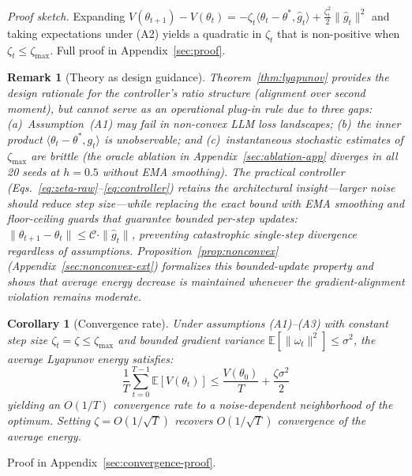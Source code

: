 \documentclass{article}
\newtheorem{corollary}{Corollary}
\newtheorem{remark}{Remark}
\begin{document}
\textit{Proof sketch.} Expanding
$V(\theta_{t+1}) - V(\theta_t) = -\zeta_t \langle \theta_t - \theta^*,
\hat{g}_t \rangle + \tfrac{\zeta_t^2}{2}\|\hat{g}_t\|^2$ and taking
expectations under (A2) yields a quadratic in $\zeta_t$ that is
non-positive when $\zeta_t \leq \zeta_{\max}$.
Full proof in Appendix~\ref{sec:proof}.

\begin{remark}[Theory as design guidance]
\label{rem:theory-practice}
Theorem~\ref{thm:lyapunov} provides the \emph{design rationale} for the controller's ratio structure (alignment over second moment), but cannot serve as an operational plug-in rule due to three gaps: (a)~Assumption~(A1) may fail in non-convex LLM loss landscapes; (b)~the inner product $\langle \theta_t{-}\theta^*, g_t \rangle$ is unobservable; and (c)~instantaneous stochastic estimates of $\zeta_{\max}$ are brittle (the oracle ablation in Appendix~\ref{sec:ablation-app} diverges in all 20 seeds at $h{=}0.5$ without EMA smoothing). The practical controller (Eqs.~\ref{eq:zeta-raw}--\ref{eq:controller}) retains the architectural insight---larger noise should reduce step size---while replacing the exact bound with EMA smoothing and floor-ceiling guards that guarantee bounded per-step updates: $\|\theta_{t+1} - \theta_t\| \leq \mathcal{C} \cdot \|\hat{g}_t\|$, preventing catastrophic single-step divergence regardless of assumptions. Proposition~\ref{prop:nonconvex} (Appendix~\ref{sec:nonconvex-ext}) formalizes this bounded-update property and shows that average energy decrease is maintained whenever the gradient-alignment violation remains moderate.
\end{remark}

\begin{corollary}[Convergence rate]
\label{cor:convergence}
Under assumptions (A1)--(A3) with constant step size
$\zeta_t = \zeta \leq \zeta_{\max}$ and bounded gradient variance
$\mathbb{E}[\|\omega_t\|^2] \leq \sigma^2$, the average
Lyapunov energy satisfies:
\begin{equation}
  \frac{1}{T}\sum_{t=0}^{T-1} \mathbb{E}[V(\theta_t)]
  \leq \frac{V(\theta_0)}{T} + \frac{\zeta \sigma^2}{2}
  \label{eq:convergence}
\end{equation}
yielding an $O(1/T)$ convergence rate to a noise-dependent
neighborhood of the optimum. Setting
$\zeta = O(1/\sqrt{T})$ recovers $O(1/\sqrt{T})$ convergence
of the average energy.
\end{corollary}
Proof in Appendix~\ref{sec:convergence-proof}.
\end{document}

